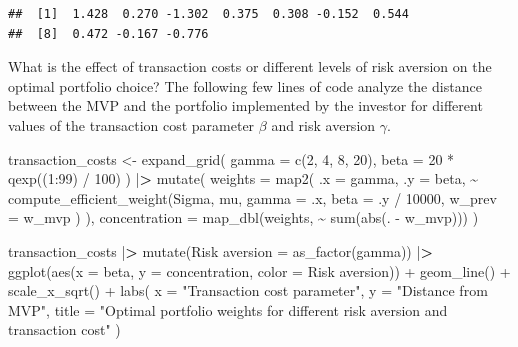 \documentclass[
]{book}
\newenvironment{Shaded}{\begin{snugshade}}{\end{snugshade}}
\newcommand{\AttributeTok}[1]{\textcolor[rgb]{0.61,0.61,0.61}{#1}}
\newcommand{\DecValTok}[1]{\textcolor[rgb]{0.06,0.06,0.06}{#1}}
\newcommand{\ErrorTok}[1]{\textcolor[rgb]{0.14,0.14,0.14}{\textbf{#1}}}
\newcommand{\FunctionTok}[1]{\textcolor[rgb]{0,0,0}{#1}}
\newcommand{\NormalTok}[1]{#1}
\newcommand{\OtherTok}[1]{\textcolor[rgb]{0.37,0.37,0.37}{#1}}
\newcommand{\SpecialCharTok}[1]{\textcolor[rgb]{0,0,0}{#1}}
\newcommand{\StringTok}[1]{\textcolor[rgb]{0.5,0.5,0.5}{#1}}
\begin{document}
\begin{verbatim}
##  [1]  1.428  0.270 -1.302  0.375  0.308 -0.152  0.544
##  [8]  0.472 -0.167 -0.776
\end{verbatim}

What is the effect of transaction costs or different levels of risk aversion on the optimal portfolio choice? The following few lines of code analyze the distance between the MVP and the portfolio implemented by the investor for different values of the transaction cost parameter \(\beta\) and risk aversion \(\gamma\).

\begin{Shaded}
\begin{Highlighting}[]
\NormalTok{transaction\_costs }\OtherTok{\textless{}{-}} \FunctionTok{expand\_grid}\NormalTok{(}
  \AttributeTok{gamma =} \FunctionTok{c}\NormalTok{(}\DecValTok{2}\NormalTok{, }\DecValTok{4}\NormalTok{, }\DecValTok{8}\NormalTok{, }\DecValTok{20}\NormalTok{),}
  \AttributeTok{beta =} \DecValTok{20} \SpecialCharTok{*} \FunctionTok{qexp}\NormalTok{((}\DecValTok{1}\SpecialCharTok{:}\DecValTok{99}\NormalTok{) }\SpecialCharTok{/} \DecValTok{100}\NormalTok{)}
\NormalTok{) }\SpecialCharTok{|}\ErrorTok{\textgreater{}}
  \FunctionTok{mutate}\NormalTok{(}
    \AttributeTok{weights =} \FunctionTok{map2}\NormalTok{(}
      \AttributeTok{.x =}\NormalTok{ gamma,}
      \AttributeTok{.y =}\NormalTok{ beta,}
      \SpecialCharTok{\textasciitilde{}} \FunctionTok{compute\_efficient\_weight}\NormalTok{(Sigma,}
\NormalTok{        mu,}
        \AttributeTok{gamma =}\NormalTok{ .x,}
        \AttributeTok{beta =}\NormalTok{ .y }\SpecialCharTok{/} \DecValTok{10000}\NormalTok{,}
        \AttributeTok{w\_prev =}\NormalTok{ w\_mvp}
\NormalTok{      )}
\NormalTok{    ),}
    \AttributeTok{concentration =} \FunctionTok{map\_dbl}\NormalTok{(weights, }\SpecialCharTok{\textasciitilde{}} \FunctionTok{sum}\NormalTok{(}\FunctionTok{abs}\NormalTok{(. }\SpecialCharTok{{-}}\NormalTok{ w\_mvp)))}
\NormalTok{  )}

\NormalTok{transaction\_costs }\SpecialCharTok{|}\ErrorTok{\textgreater{}}
  \FunctionTok{mutate}\NormalTok{(}\StringTok{\textasciigrave{}}\AttributeTok{Risk aversion}\StringTok{\textasciigrave{}} \OtherTok{=} \FunctionTok{as\_factor}\NormalTok{(gamma)) }\SpecialCharTok{|}\ErrorTok{\textgreater{}}
  \FunctionTok{ggplot}\NormalTok{(}\FunctionTok{aes}\NormalTok{(}\AttributeTok{x =}\NormalTok{ beta, }\AttributeTok{y =}\NormalTok{ concentration, }\AttributeTok{color =} \StringTok{\textasciigrave{}}\AttributeTok{Risk aversion}\StringTok{\textasciigrave{}}\NormalTok{)) }\SpecialCharTok{+}
  \FunctionTok{geom\_line}\NormalTok{() }\SpecialCharTok{+}
  \FunctionTok{scale\_x\_sqrt}\NormalTok{() }\SpecialCharTok{+}
  \FunctionTok{labs}\NormalTok{(}
    \AttributeTok{x =} \StringTok{"Transaction cost parameter"}\NormalTok{,}
    \AttributeTok{y =} \StringTok{"Distance from MVP"}\NormalTok{,}
    \AttributeTok{title =} \StringTok{"Optimal portfolio weights for different risk aversion and transaction cost"}
\NormalTok{  )}
\end{Highlighting}
\end{Shaded}
\end{document}
